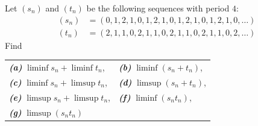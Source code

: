\documentclass[11pt]{scrartcl}
\theoremstyle{problem}
\newenvironment{problem}[1]
{\renewcommand\theinnercustomthm{#1}\innercustomthm}
{\endinnercustomthm}
\theoremstyle{remark}
\begin{document}
\pagebreak
\begin{problem}{12.3}
	Let $(s_n)$ and $(t_n)$ be the following sequences with period $4$:
	\begin{align*}
		(s_n) &= (0, 1, 2, 1, 0, 1, 2, 1, 0, 1, 2, 1, 0, 1, 2, 1, 0, \dots)\\
		(t_n) &= (2, 1, 1, 0, 2, 1, 1, 0, 2, 1, 1, 0, 2, 1, 1, 0, 2, \dots)
	\end{align*}
	Find
	
	\begin{tabularx}{\linewidth}{XX}
		\emph{\textbf{(a)}} $\liminf s_n + \liminf t_n$, &
		\emph{\textbf{(b)}} $\liminf(s_n + t_n)$,\\
		\emph{\textbf{(c)}} $\liminf s_n + \limsup t_n$, &
		\emph{\textbf{(d)}} $\limsup(s_n + t_n)$,\\
		\emph{\textbf{(e)}} $\limsup s_n + \limsup t_n$, &
		\emph{\textbf{(f)}} $\liminf(s_nt_n)$,\\
		\emph{\textbf{(g)}} $\limsup(s_nt_n)$ & 
	\end{tabularx}
\end{problem}
\end{document}

